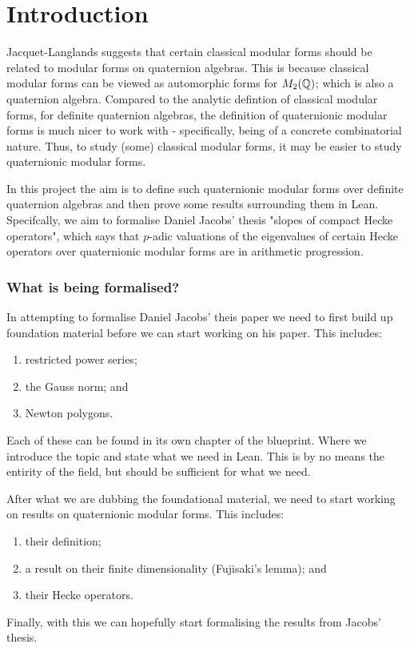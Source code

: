 \chapter{Introduction}

Jacquet-Langlands suggests that certain classical modular forms should be related to modular forms
on quaternion algebras. This is because classical modular forms can be viewed as automorphic forms
for $M_2 (\mathbb{Q})$; which is also a quaternion algebra. Compared to the analytic defintion of classical
modular forms, for definite quaternion algebras, the definition of quaternionic modular forms is
much nicer to work with - specifically, being of a concrete combinatorial nature. Thus, to study
(some) classical modular forms, it may be easier to study quaternionic modular forms.

In this project the aim is to define such quaternionic modular forms over definite quaternion
algebras and then prove some results surrounding them in Lean. Specifcally, we aim to formalise
Daniel Jacobs' thesis "slopes of compact Hecke operators", which says that $p$-adic valuations of the
eigenvalues of certain Hecke operators over quaternionic modular forms are in arithmetic
progression.

\subsection{What is being formalised?}

In attempting to formalise Daniel Jacobs' theis paper we need to first build up foundation material
before we can start working on his paper. This includes:

\begin{enumerate}
  \item restricted power series;
  \item the Gauss norm; and
  \item Newton polygons.
\end{enumerate}

Each of these can be found in its own chapter of the blueprint. Where we introduce the topic and
state what we need in Lean. This is by no means the entirity of the field, but should be sufficient
for what we need.

After what we are dubbing the foundational material, we need to start working on results on
quaternionic modular forms. This includes:
\begin{enumerate}
  \item their definition;
  \item a result on their finite dimensionality (Fujisaki's lemma); and
  \item their Hecke operators.
\end{enumerate}

Finally, with this we can hopefully start formalising the results from Jacobs' thesis.
